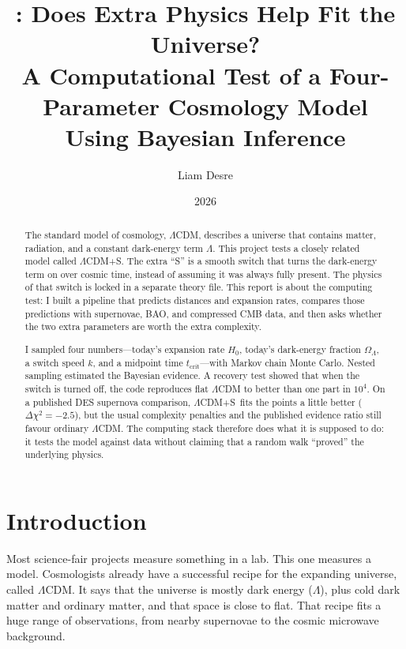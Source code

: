 \documentclass[12pt,letterpaper]{article}
\title{%
  \textbf{\Lcdms: Does Extra Physics Help Fit the Universe?}\\[0.4em]
  \large A Computational Test of a Four-Parameter Cosmology Model\\
  Using Bayesian Inference
}
\author{Liam Desre}
\date{2026}
\newcommand{\Lcdms}{$\Lambda$CDM+S}
\newcommand{\tcrit}{t_{\mathrm{crit}}}
\begin{document}
\maketitle

\begin{abstract}
The standard model of cosmology, $\Lambda$CDM, describes a universe that
contains matter, radiation, and a constant dark-energy term $\Lambda$.
This project tests a closely related model called \Lcdms. The extra
``S'' is a smooth switch that turns the dark-energy term on over cosmic
time, instead of assuming it was always fully present. The physics of
that switch is locked in a separate theory file. This report is about
the computing test: I built a pipeline that predicts distances and
expansion rates, compares those predictions with supernovae, BAO, and
compressed CMB data, and then asks whether the two extra parameters are
worth the extra complexity.

I sampled four numbers---today's expansion rate $H_0$, today's dark-energy
fraction $\Omega_\Lambda$, a switch speed $k$, and a midpoint time
$\tcrit$---with Markov chain Monte Carlo. Nested sampling estimated the
Bayesian evidence. A recovery test showed that when the switch is turned
off, the code reproduces flat $\Lambda$CDM to better than one part in
$10^4$. On a published DES supernova comparison, \Lcdms\ fits the
points a little better ($\Delta\chi^2=-2.5$), but the usual complexity
penalties and the published evidence ratio still favour ordinary
$\Lambda$CDM. The computing stack therefore does what it is supposed to
do: it tests the model against data without claiming that a random walk
``proved'' the underlying physics.
\end{abstract}


\section{Introduction}

Most science-fair projects measure something in a lab. This one measures
a model. Cosmologists already have a successful recipe for the expanding
universe, called $\Lambda$CDM. It says that the universe is mostly dark
energy ($\Lambda$), plus cold dark matter and ordinary matter, and that
space is close to flat. That recipe fits a huge range of observations,
from nearby supernovae to the cosmic microwave background.
\end{document}
